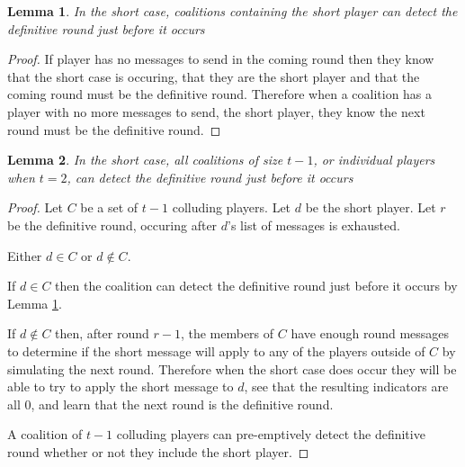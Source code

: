 \documentclass{dalcsthesis}
\newtheorem{lemma}{Lemma}
\begin{document}
\begin{lemma} In the short case, coalitions containing the short player can detect the definitive round just before it occurs \label{Lem:SUIP:ShortPlayerCoalitionsPremptivelyKnowShortRound} \end{lemma}
\begin{proof}
If player has no messages to send in the coming round then they know that the short case is occuring, that they are the short player and that the coming round must be the definitive round. Therefore when a coalition has a player with no more messages to send, the short player, they know the next round must be the definitive round.
\end{proof}

\begin{lemma} In the short case, all coalitions of size $t-1$, or individual players when $t = 2$, can detect the definitive round just before it occurs \label{Lem:SUIP:MaxSizeCoalitionsPremptivelyKnowShortRound} \end{lemma}
\begin{proof}
Let $C$ be a set of $t-1$ colluding players. Let $d$ be the short player. Let $r$ be the definitive round, occuring after $d$'s list of messages is exhausted.

Either $d \in C$ or $d \notin C$.

If $d \in C$ then the coalition can detect the definitive round just before it occurs by Lemma \ref{Lem:SUIP:ShortPlayerCoalitionsPremptivelyKnowShortRound}.

If $d \notin C$ then, after round $r-1$, the members of $C$ have enough round messages to determine if the short message will apply to any of the players outside of $C$ by simulating the next round. Therefore when the short case does occur they will be able to try to apply the short message to $d$, see that the resulting indicators are all $0$, and learn that the next round is the definitive round.

A coalition of $t-1$ colluding players can pre-emptively detect the definitive round whether or not they include the short player.
\end{proof}
 
\end{document}

